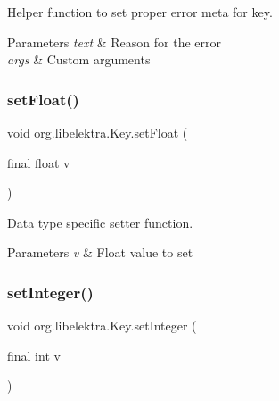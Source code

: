 Helper function to set proper error meta for key. 


\begin{DoxyParams}{Parameters}
{\em text} & Reason for the error \\
\hline
{\em args} & Custom arguments \\
\hline
\end{DoxyParams}
\mbox{\label{classorg_1_1libelektra_1_1Key_a1436207a0efa244538c935766b8db470}} 
\subsubsection{\texorpdfstring{set\+Float()}{setFloat()}}
{\footnotesize\ttfamily void org.\+libelektra.\+Key.\+set\+Float (\begin{DoxyParamCaption}\item[{final float}]{v }\end{DoxyParamCaption})\hspace{0.3cm}{\ttfamily [inline]}}



Data type specific setter function. 


\begin{DoxyParams}{Parameters}
{\em v} & Float value to set \\
\hline
\end{DoxyParams}
\mbox{\label{classorg_1_1libelektra_1_1Key_a290d278b4c11ea4bcabf82c0c97e6350}} 
\subsubsection{\texorpdfstring{set\+Integer()}{setInteger()}}
{\footnotesize\ttfamily void org.\+libelektra.\+Key.\+set\+Integer (\begin{DoxyParamCaption}\item[{final int}]{v }\end{DoxyParamCaption})\hspace{0.3cm}{\ttfamily [inline]}}



